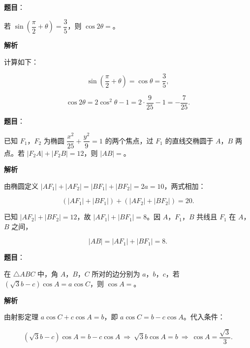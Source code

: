 \begin{answer}

\textbf{题目}：

若 $\sin\left(\dfrac{\pi}2+\theta\right)=\dfrac35$，则 $\cos2\theta=$\gkblank{}。

\textbf{解析}

计算如下：

\nopagebreak[4]
\[\sin\left(\frac{\pi}2+\theta\right)=\cos\theta=\frac35,\]

\nopagebreak[4]
\[\cos2\theta=2\cos^2\theta-1=2\cdot\frac9{25}-1=-\frac7{25}.\]


\end{answer}
\begin{answer}

\textbf{题目}：

已知 $F_1$，$F_2$ 为椭圆 $\dfrac{x^2}{25}+\dfrac{y^2}9=1$ 的两个焦点，过 $F_1$ 的直线交椭圆于 $A$，$B$ 两点。若 $|F_2A|+|F_2B|=12$，则 $|AB|=$\gkblank{}。

\textbf{解析}

由椭圆定义 $|AF_1|+|AF_2|=|BF_1|+|BF_2|=2a=10$，两式相加：

\nopagebreak[4]
\[\left(|AF_1|+|BF_1|\right)+\left(|AF_2|+|BF_2|\right)=20.\]

已知 $|AF_2|+|BF_2|=12$，故 $|AF_1|+|BF_1|=8$。因 $A$，$F_1$，$B$ 共线且 $F_1$ 在 $A$，$B$ 之间，

\nopagebreak[4]
\[|AB|=|AF_1|+|BF_1|=8.\]


\end{answer}
\begin{answer}

\textbf{题目}：

在 $\triangle ABC$ 中，角 $A$，$B$，$C$ 所对的边分别为 $a$，$b$，$c$，若 $(\sqrt3b-c)\cos A=a\cos C$，则 $\cos A=$\gkblank{}。

\textbf{解析}

由射影定理 $a\cos C+c\cos A=b$，即 $a\cos C=b-c\cos A$。代入条件：

\nopagebreak[4]
\[(\sqrt3b-c)\cos A=b-c\cos A\ \Longrightarrow\ \sqrt3b\cos A=b\ \Longrightarrow\ \cos A=\frac{\sqrt3}3.\]


\end{answer}

